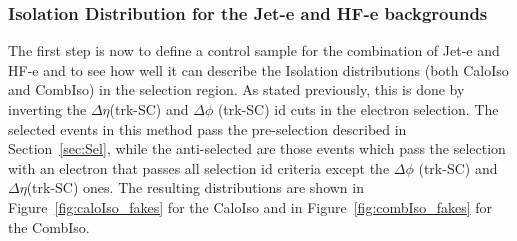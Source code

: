 \subsubsection{Isolation Distribution for the Jet-e and HF-e backgrounds}

The first step is now to define a control sample for the combination of Jet-e and HF-e and to see how well it can describe the Isolation distributions (both CaloIso and CombIso) in the selection region.  As stated previously, this is done by inverting the $\Delta \eta$(trk-SC) and $\Delta \phi$ (trk-SC) id cuts in the electron selection. The selected events in this method pass the pre-selection described in Section~\ref{sec:Sel}, while the anti-selected are those events which pass the selection with an electron that passes all selection id criteria except the $\Delta \phi$ (trk-SC) and $\Delta \eta$(trk-SC) ones.  The resulting distributions are shown in Figure~\ref{fig:caloIso_fakes} for the CaloIso and in Figure~\ref{fig:combIso_fakes} for the CombIso.

